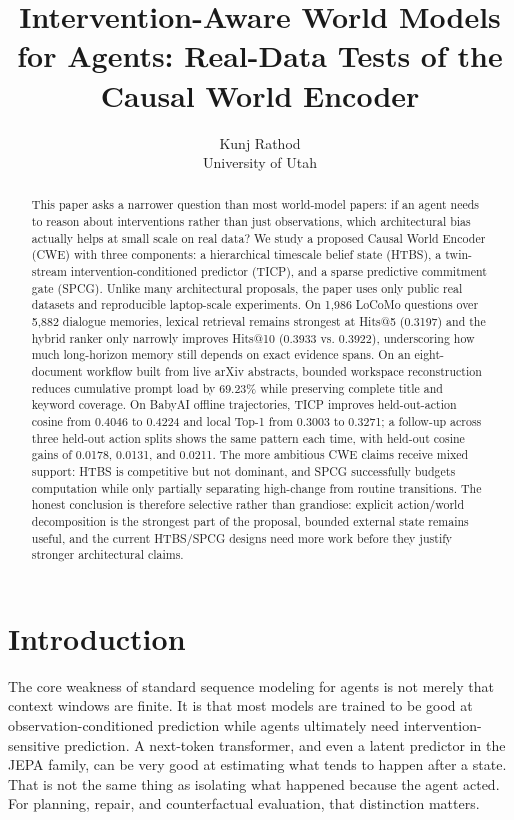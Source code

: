 \documentclass[11pt]{article}
\title{Intervention-Aware World Models for Agents: Real-Data Tests of the Causal World Encoder}
\author{Kunj Rathod\\University of Utah}
\date{}
\begin{document}
\maketitle

\begin{abstract}
This paper asks a narrower question than most world-model papers: if an agent needs to reason about interventions rather than just observations, which architectural bias actually helps at small scale on real data? We study a proposed Causal World Encoder (CWE) with three components: a hierarchical timescale belief state (HTBS), a twin-stream intervention-conditioned predictor (TICP), and a sparse predictive commitment gate (SPCG). Unlike many architectural proposals, the paper uses only public real datasets and reproducible laptop-scale experiments. On 1,986 LoCoMo questions over 5,882 dialogue memories, lexical retrieval remains strongest at Hits@5 (0.3197) and the hybrid ranker only narrowly improves Hits@10 (0.3933 vs. 0.3922), underscoring how much long-horizon memory still depends on exact evidence spans. On an eight-document workflow built from live arXiv abstracts, bounded workspace reconstruction reduces cumulative prompt load by 69.23\% while preserving complete title and keyword coverage. On BabyAI offline trajectories, TICP improves held-out-action cosine from 0.4046 to 0.4224 and local Top-1 from 0.3003 to 0.3271; a follow-up across three held-out action splits shows the same pattern each time, with held-out cosine gains of 0.0178, 0.0131, and 0.0211. The more ambitious CWE claims receive mixed support: HTBS is competitive but not dominant, and SPCG successfully budgets computation while only partially separating high-change from routine transitions. The honest conclusion is therefore selective rather than grandiose: explicit action/world decomposition is the strongest part of the proposal, bounded external state remains useful, and the current HTBS/SPCG designs need more work before they justify stronger architectural claims.
\end{abstract}

\section{Introduction}
The core weakness of standard sequence modeling for agents is not merely that context windows are finite. It is that most models are trained to be good at observation-conditioned prediction while agents ultimately need intervention-sensitive prediction. A next-token transformer, and even a latent predictor in the JEPA family, can be very good at estimating what tends to happen after a state. That is not the same thing as isolating what happened because the agent acted. For planning, repair, and counterfactual evaluation, that distinction matters.
\end{document}
